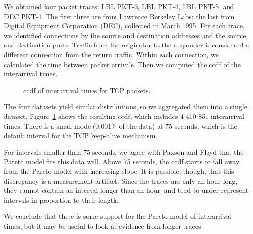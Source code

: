 \documentclass{elsart}
\begin{document}
We obtained four packet traces: LBL PKT-3, LBL PKT-4, LBL PKT-5, and
DEC PKT-1.  The first three are from Lawrence Berkeley Labs; the last
from Digital Equipment Corporation (DEC), collected in March 1995.
For each trace, we identified connections by the source
and destination addresses and the source and destination ports.
Traffic from the originator to the responder is considered
a different connection from the return traffic.  Within each
connection, we calculated the time between packet arrivals.
Then we computed the ccdf of the interarrival times.

\begin{figure}[tb]
\centerline{}
\caption{ccdf of interarrival times for TCP packets.}
\label{fig.tcp_inter}
\end{figure}

The four datasets yield similar distributions, so we aggregated them
into a single dataset.  Figure~\ref{fig.tcp_inter} shows the resulting
ccdf, which includes 4 410 851 interarrival times.  There is a small
mode (0.001\% of the data) at 75 seconds, which is the default
interval for the TCP keep-alive mechanism.

For intervals smaller than 75 seconds, we agree with Paxson and
Floyd that the Pareto model fits this data well.  Above 75
seconds, the ccdf starts to fall away from the Pareto model with
increasing slope.  It is possible, though, that this discrepancy
is a measurement artifact.  Since the traces are only an hour long,
they cannot contain an interval longer than an hour, and tend to
under-represent intervals in proportion to their length.

We conclude that there is some support for the Pareto model of
interarrival times, but it may be useful to look
at evidence from longer traces.




\end{document}
